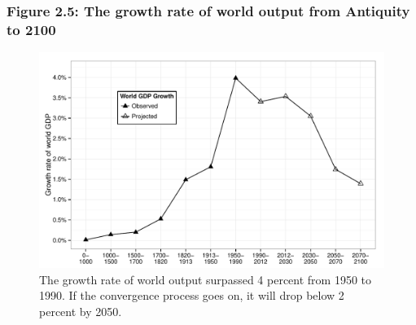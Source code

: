 \documentclass[t]{beamer}\usepackage[]{graphicx}\usepackage[]{color}
\newenvironment{knitrout}{}{} %
\begin{document}
\begin{frame}[label=Figure_2_5]
\frametitle{Figure 2.5: The growth rate of world output from Antiquity to 2100}
\begin{figure}[t]
\begin{minipage}[b]{\textwidth}
\centering
\begin{knitrout}\footnotesize
{}\color{fgcolor}

{\centering \includegraphics[width=1\linewidth]{figures/bw/Figure_2_5} 

}



\end{knitrout}
\caption{The growth rate of world output surpassed 4 percent from 1950 to 1990. If the convergence process goes on, it will drop below 2 percent by 2050.}
\end{minipage}
\end{figure}
\end{frame}
\end{document}
